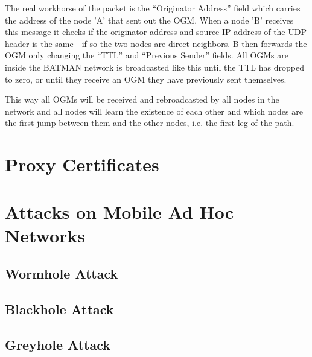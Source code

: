The real workhorse of the packet is the ``Originator Address'' field which
carries the address of the node 'A' that sent out the \ac{OGM}. When a node 'B'
receives this message it checks if the originator address and source IP address
of the UDP header is the same - if so the two nodes are direct neighbors. B then
forwards the \ac{OGM} only changing the ``TTL'' and ``Previous Sender'' fields.
All \acp{OGM} are inside the BATMAN network is broadcasted like this until the
TTL has dropped to zero, or until they receive an \ac{OGM} they have
previously sent themselves.

This way all \acp{OGM} will be received and rebroadcasted by all nodes in the
network and all nodes will learn the existence of each other and which nodes are
the first jump between them and the other nodes, i.e. the first leg of the path.



\section{Proxy Certificates}

\section{Attacks on Mobile Ad Hoc Networks}
\subsection{Wormhole Attack}
\subsection{Blackhole Attack}
\subsection{Greyhole Attack}
